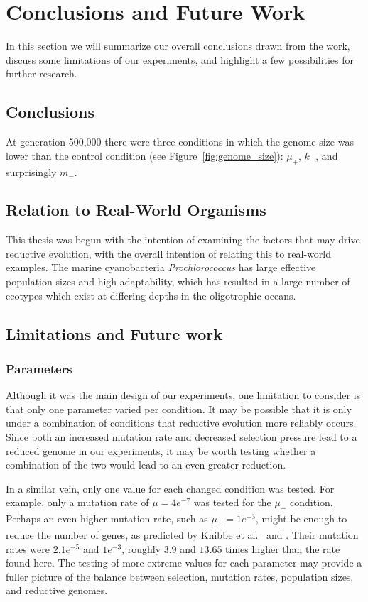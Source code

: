 
\chapter{Conclusions and Future Work}\label{ch:conclusion}
In this section we will summarize our overall conclusions drawn from the work, discuss some limitations of our experiments, and highlight a few possibilities for further research.

\section{Conclusions}
At generation 500,000 there were three conditions in which the genome size was lower than the control condition (see Figure~\ref{fig:genome_size}): $\mu_+$, $k_-$, and surprisingly $m_-$. 

\section{Relation to Real-World Organisms}
This thesis was begun with the intention of examining the factors that may drive reductive evolution, with the overall intention of relating this to real-world examples. The marine cyanobacteria \textit{Prochlorococcus} has large effective population sizes and high adaptability, which has resulted in a large number of ecotypes which exist at differing depths in the oligotrophic oceans. 
  
\section{Limitations and Future work}\label{limitations}
\subsection{Parameters}
Although it was the main design of our experiments, one limitation to consider is that only one parameter varied per condition. It may be possible that it is only under a combination of conditions that reductive evolution more reliably occurs. Since both an increased mutation rate and decreased selection pressure lead to a reduced genome in our experiments, it may be worth testing whether a combination of the two would lead to an even greater reduction. 

In a similar vein, only one value for each changed condition was tested. For example, only a mutation rate of $\mu = 4e^{-7}$ was tested for the $\mu_+$ condition. Perhaps an even higher mutation rate, such as $\mu_+ = 1e^{-3}$, might be enough to reduce the number of genes, as predicted by Knibbe et al.~\cite{Knibbe2007} and \cite{Liard.2018}. Their mutation rates were $2.1e^{-5}$ and $1e^{-3}$, roughly $3.9$ and $13.65$ times higher than the rate found here. The testing of more extreme values for each parameter may provide a fuller picture of the balance between selection, mutation rates, population sizes, and reductive genomes. 

